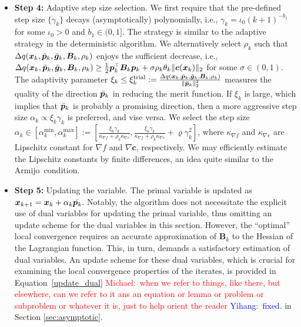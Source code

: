 \documentclass[aos]{imsart}
\numberwithin{equation}{section}
\theoremstyle{plain}
\newcommand{\michael}[1]{\textcolor{red}{Michael:\ #1}}
\newcommand{\yihang}[1]{\textcolor{blue}{Yihang:\ #1}}
\begin{document}
\begin{itemize}
    \item \textbf{Step 4:} Adaptive step size selection. We first require that the pre-defined step size $\{\gamma_k\}$ decays (asymptotically) polynomially, i.e., $\gamma_k = \iota_0 \left(k+1 \right)^{-b_1}$ for some $\iota_0 > 0$ and $b_1 \in (0,1]$. 
    The strategy is similar to the adaptive strategy in the deterministic algorithm. We alternatively select $\rho_k$ such that $\Delta q(\bm{x}_k,\Bar{\bm{p}}_k, \Bar{\bm{g}}_k, \bm{B}_k,\rho_k)$ enjoys the sufficient decrease, i.e., $\Delta q(\bm{x}_k,\Bar{\bm{p}}_k, \Bar{\bm{g}}_k, \bm{B}_k,\rho_k) \geq \frac{1}{2} \bm{p}_k^{\top} \bm{B}_k \bm{p}_k + \sigma \rho_k \theta_k \|\bm{c}(\bm{x}_k)\|_2$ for some $\sigma \in (0,1)$. The adaptivity parameter $\xi_k \leq \xi_k^{\text{trial}} := \frac{\Delta q(\bm{x}_k,\Bar{\bm{p}}_k, \Bar{\bm{g}}_k,\bm{B}_k,\rho_k)}{\|\Bar{\bm{p}}_k\|_2^2}$ measures the quality of the direction $\Bar{\bm{p}}_k$ in reducing the merit function. If $\xi_k$ is large, which implies that $\Bar{\bm{p}}_k$ is probably a promising direction, then a more aggressive step size $\alpha_k \propto \xi_k \gamma_k$ is preferred, and vise versa. We select the step size  $\alpha_k \in \left[\alpha_k^{\text{min}}, \alpha_k^{\max} \right] :=  \left[ \frac{ \xi_{k}\gamma_k}{\kappa_{\nabla f} + \rho_k \kappa_{\nabla c}} , \frac{ \xi_{k}\gamma_k}{\kappa_{\nabla f} + \rho_k \kappa_{\nabla c}} + \varrho \gamma_k^2 \right]$, where $\kappa_{\nabla f}$ and $\kappa_{\nabla c}$ are Lipschitz constant for $\nabla f$ and $\nabla \bm{c}$, respectively. We may efficiently estimate the Lipschitz constants by finite differences, an idea quite similar to the Armijo~condition.

    \item \textbf{Step 5:} Updating the variable. The primal variable is updated as $\bm{x}_{k+1} = \bm{x}_k + \alpha_k \Bar{\bm{p}_k}$. 
    Notably, the algorithm does not necessitate the explicit use of dual variables for updating the primal variable, thus omitting an update scheme for the dual variables in this section.
    However, the ``optimal'' local convergence requires an accurate approximation of $\bm{B}_k$ to the Hessian of the Lagrangian function. This, in turn, demands a satisfactory estimation of dual variables. 
    An update scheme for these dual variables, which is crucial for examining the local convergence properties of the iterates, is provided in Equation~\eqref{update_dual} 
    \michael{when we refer to things, like there, but elsewhere, can we refer to it ans an equation or lemma or problem or subproblem or whatever it is, just to help orient the reader} \yihang{fixed.}
    in Section \ref{sec:asymptotic}.
\end{itemize}
\end{document}
